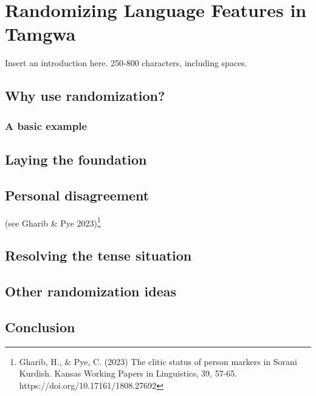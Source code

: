 \documentclass[a4paper,12pt,twoside,openright]{memoir}
\begin{document}



\chapter[Randomizing Language Features][Tamgwa]{Randomizing Language Features in Tamgwa}


\thispagestyle{fancy}
\BgUsetrue


Insert an introduction here. 250-800 characters, including spaces.

\section*{Why use randomization?} %

\lipsum[1]

\subsection*{A basic example}

\lipsum[2]

\section*{Laying the foundation} %

\lipsum[4]

\section*{Personal disagreement} %

\lipsum[5]

(see Gharib \& Pye 2023)\footnote{Gharib, H., \& Pye, C. (2023) The clitic status of person markers in Sorani Kurdish. Kansas Working Papers in Linguistics, 39, 57-65. https://doi.org/10.17161/1808.27692}

\section*{Resolving the tense situation} %

\lipsum[6]

\section*{Other randomization ideas} %

\lipsum[7]

\section*{Conclusion} %

\lipsum[8]
\end{document}
